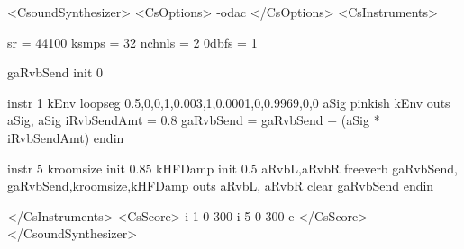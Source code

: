 <CsoundSynthesizer>
<CsOptions>
-odac 
</CsOptions>
<CsInstruments>

sr =  44100
ksmps = 32
nchnls = 2
0dbfs = 1

gaRvbSend    init      0

  instr 1 
kEnv         loopseg   0.5,0,0,1,0.003,1,0.0001,0,0.9969,0,0
aSig         pinkish   kEnv           
             outs      aSig, aSig        
iRvbSendAmt  =         0.8               
gaRvbSend    =         gaRvbSend + (aSig * iRvbSendAmt)
  endin

  instr 5
kroomsize    init      0.85       
kHFDamp      init      0.5        
aRvbL,aRvbR  freeverb  gaRvbSend, gaRvbSend,kroomsize,kHFDamp
             outs      aRvbL, aRvbR 
             clear     gaRvbSend    
  endin

</CsInstruments>
<CsScore>
i 1 0 300
i 5 0 300
e
</CsScore>
</CsoundSynthesizer>
